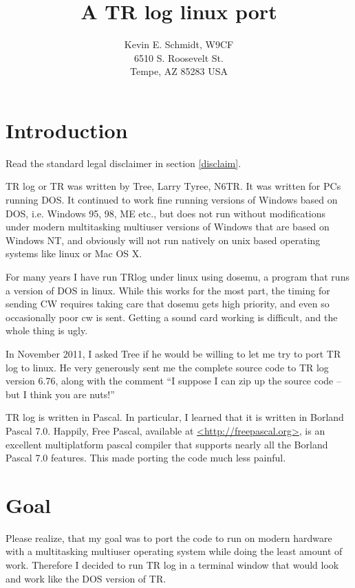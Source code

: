 \documentclass[12pt]{article}
\begin{document}
\title{A TR log linux port}
\author{
Kevin E. Schmidt, W9CF\\
6510 S. Roosevelt St.\\
Tempe, AZ 85283 USA\\
}
\date{}
\maketitle
\vskip 2cm
\tableofcontents
\vskip 2cm
\section{Introduction}
Read the standard legal disclaimer in section \ref{disclaim}.
\vskip 0.5cm

TR log or TR was written by Tree, Larry Tyree, N6TR. It was written for PCs
running DOS. It continued to work fine running versions of Windows based
on DOS, i.e. Windows 95, 98, ME etc., but does not run without
modifications under modern
multitasking multiuser versions of Windows that are based on Windows NT,
and obviously will not run natively on unix based operating systems like
linux or Mac OS X.

For many years I have run TRlog under linux using dosemu, a program that
runs a version of DOS in linux. While this works for the most part,
the timing for sending CW requires taking care that dosemu gets high
priority, and even so occasionally poor cw is sent. Getting a sound card
working is difficult, and the whole thing is ugly.

In November 2011, I asked Tree if he would be willing to let me try to
port TR log to linux. He very generously sent me the complete source
code to TR log version 6.76, along with the comment ``I suppose I can
zip up the source code -- but I think you are nuts!''

TR log is written in Pascal. In particular, I learned that it
is written in Borland Pascal 7.0. Happily, Free Pascal,
available at
\url{<http://freepascal.org>},
is an excellent multiplatform pascal compiler that supports
nearly all the Borland Pascal 7.0 features. This made porting
the code much less painful.

\section{Goal}

Please realize, that my goal was to port the code to run on modern
hardware with a multitasking multiuser operating system while doing
the least
amount of work. Therefore I decided to run TR log in a terminal window
that would look and work like the DOS version of TR.
\end{document}
